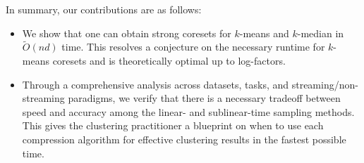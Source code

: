 In summary, our contributions are as follows:
\begin{itemize}

    \item We show that one can obtain strong coresets for $k$-means and $k$-median in $\tilde{O}(nd)$ time. This resolves a conjecture on the necessary runtime
        for $k$-means coresets \cite{DSWY22} and is theoretically optimal up to log-factors.

    \item Through a comprehensive analysis across datasets, tasks, and streaming/non-streaming paradigms, we verify that there is a necessary tradeoff between
        speed and accuracy among the linear- and sublinear-time sampling methods. This gives the clustering practitioner a blueprint on when to use each
        compression algorithm for effective clustering results in the fastest possible time.

\end{itemize}
